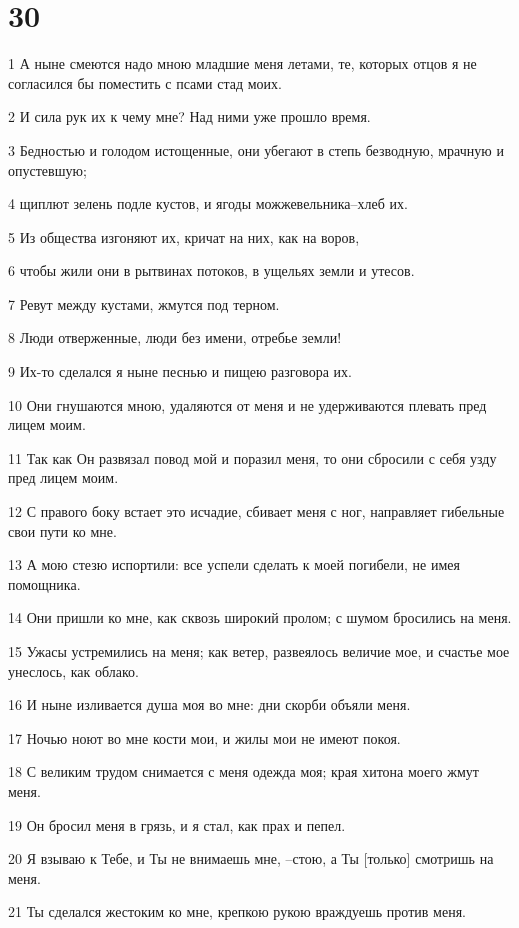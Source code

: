 \chapter{30}

\par 1 А ныне смеются надо мною младшие меня летами, те, которых отцов я не согласился бы поместить с псами стад моих.
\par 2 И сила рук их к чему мне? Над ними уже прошло время.
\par 3 Бедностью и голодом истощенные, они убегают в степь безводную, мрачную и опустевшую;
\par 4 щиплют зелень подле кустов, и ягоды можжевельника--хлеб их.
\par 5 Из общества изгоняют их, кричат на них, как на воров,
\par 6 чтобы жили они в рытвинах потоков, в ущельях земли и утесов.
\par 7 Ревут между кустами, жмутся под терном.
\par 8 Люди отверженные, люди без имени, отребье земли!
\par 9 Их-то сделался я ныне песнью и пищею разговора их.
\par 10 Они гнушаются мною, удаляются от меня и не удерживаются плевать пред лицем моим.
\par 11 Так как Он развязал повод мой и поразил меня, то они сбросили с себя узду пред лицем моим.
\par 12 С правого боку встает это исчадие, сбивает меня с ног, направляет гибельные свои пути ко мне.
\par 13 А мою стезю испортили: все успели сделать к моей погибели, не имея помощника.
\par 14 Они пришли ко мне, как сквозь широкий пролом; с шумом бросились на меня.
\par 15 Ужасы устремились на меня; как ветер, развеялось величие мое, и счастье мое унеслось, как облако.
\par 16 И ныне изливается душа моя во мне: дни скорби объяли меня.
\par 17 Ночью ноют во мне кости мои, и жилы мои не имеют покоя.
\par 18 С великим трудом снимается с меня одежда моя; края хитона моего жмут меня.
\par 19 Он бросил меня в грязь, и я стал, как прах и пепел.
\par 20 Я взываю к Тебе, и Ты не внимаешь мне, --стою, а Ты [только] смотришь на меня.
\par 21 Ты сделался жестоким ко мне, крепкою рукою враждуешь против меня.
